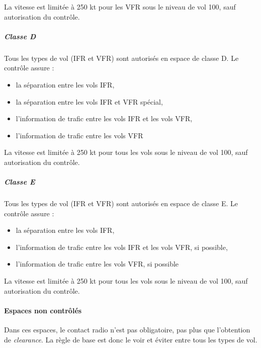 		La vitesse est limitée à 250 kt pour les VFR sous le niveau de vol 100, sauf autorisation du contrôle.
		
		\subparagraph{Classe D}\label{classeD}
		Tous les types de vol (IFR et VFR) sont autorisés en espace de classe D. Le contrôle assure :
		\begin{itemize}
		\item la séparation entre les vols IFR,
		\item la séparation entre les vols IFR et VFR spécial,
		\item l'information de trafic entre les vols IFR et les vols VFR,
		\item l'information de trafic entre les vols VFR
		\end{itemize}
		
		
		La vitesse est limitée à 250 kt pour tous les vols sous le niveau de vol 100, sauf autorisation du contrôle.
		
		\subparagraph{Classe E}
		Tous les types de vol (IFR et VFR) sont autorisés en espace de classe E. Le contrôle assure :
		\begin{itemize}
		\item la séparation entre les vols IFR,
		\item l'information de trafic entre les vols IFR et les vols VFR, si possible,
		\item l'information de trafic entre les vols VFR, si possible
		\end{itemize}
		
		
		
		La vitesse est limitée à 250 kt pour tous les vols sous le niveau de vol 100, sauf autorisation du contrôle.
		
		\paragraph{Espaces non contrôlés}
		Dans ces espaces, le contact radio n'est pas obligatoire, pas plus que l'obtention de \textit{clearance}. La règle de base est donc le voir et éviter entre tous les types de vol.
				
